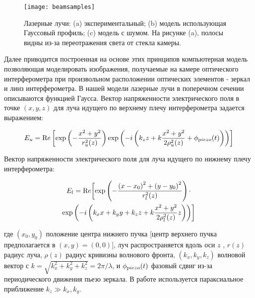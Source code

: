 \begin{figure}
\centering
  \texttt{[image: beamsamples]}

\caption{Лазерные лучи: (a) экспериментальный; (b) модель использующая Гауссовый профиль; (c) модель с шумом. На рисунке (a), полосы видны из-за переотражения света от стекла камеры.}
\label{fig:noise}
\end{figure}

Далее приводится построенная на основе этих принципов компьютерная модель позволяющая моделировать изображения, получаемые на камере оптического интерферометра при произвольном расположении оптических элементов - зеркал и линз интерферометра. В нашей модели лазерные лучи в поперечном сечении описываются функцией Гаусса. Вектор напряженности электрического поля в точке $(x,y,z)$ для луча идущего по верхнему плечу интерферометра задается выражением:

\begin{equation}
    E_u={\textrm Re}\left[\exp \left(-\frac{x^{2}+y^{2}}{r_u^{2}(z)}\right) \exp \left(-i\left(k_{z} z+ k\frac{x^2+y^2}{2\rho^2_u(z)} + \phi_{\textrm piezo}(t)\right)\right)\right]
    \label{eq:upper_beam}
\end{equation}

Вектор напряженности электрического поля для луча идущего по нижнему плечу интерферометра:

\begin{multline}
    E_l={\textrm Re}\biggl[\exp \left(-\frac{\left(x-x_{0}\right)^{2}+\left(y-y_{0}\right)^{2}}{r_l^{2}(z)}\right)  \cdot \\
    \exp \left(-i\left(k_{x} x+k_{y} y+k_{z} z + k\frac{x^2+y^2}{2\rho^2_l(z)} z\right)\right)\biggr]
    \label{eq:lower_beam}
\end{multline}

где $(x_0, y_0)$ положение центра нижнего пучка [центр верхнего пучка предполагается в $(x,y)=(0,0)$], луч распространяется вдоль оси $z$ , %
$r(z)$ радиус луча, $\rho(z)$ радиус кривизны волнового фронта, $(k_x,k_y,k_z)$ волновой вектор с $k=\sqrt{k_x^2+k_y^2+k_z^2}=2\pi/\lambda$, и $\phi_{\textrm piezo}(t)$ фазовый сдвиг из-за периодического движения пьезо зеркала. В работе используется параксиальное приближение $k_z \gg k_x, k_y$. 

